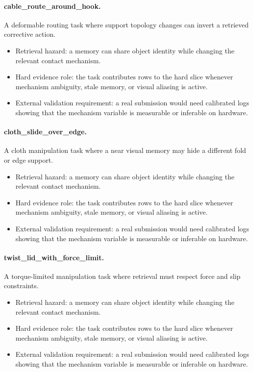 \documentclass{article}
\begin{document}
\paragraph{cable\_route\_around\_hook.} A deformable routing task where support topology changes can invert a retrieved corrective action.
\begin{itemize}
\item Retrieval hazard: a memory can share object identity while changing the relevant contact mechanism.
\item Hard evidence role: the task contributes rows to the hard slice whenever mechanism ambiguity, stale memory, or visual aliasing is active.
\item External validation requirement: a real submission would need calibrated logs showing that the mechanism variable is measurable or inferable on hardware.
\end{itemize}
\paragraph{cloth\_slide\_over\_edge.} A cloth manipulation task where a near visual memory may hide a different fold or edge support.
\begin{itemize}
\item Retrieval hazard: a memory can share object identity while changing the relevant contact mechanism.
\item Hard evidence role: the task contributes rows to the hard slice whenever mechanism ambiguity, stale memory, or visual aliasing is active.
\item External validation requirement: a real submission would need calibrated logs showing that the mechanism variable is measurable or inferable on hardware.
\end{itemize}
\paragraph{twist\_lid\_with\_force\_limit.} A torque-limited manipulation task where retrieval must respect force and slip constraints.
\begin{itemize}
\item Retrieval hazard: a memory can share object identity while changing the relevant contact mechanism.
\item Hard evidence role: the task contributes rows to the hard slice whenever mechanism ambiguity, stale memory, or visual aliasing is active.
\item External validation requirement: a real submission would need calibrated logs showing that the mechanism variable is measurable or inferable on hardware.
\end{itemize}
\end{document}
